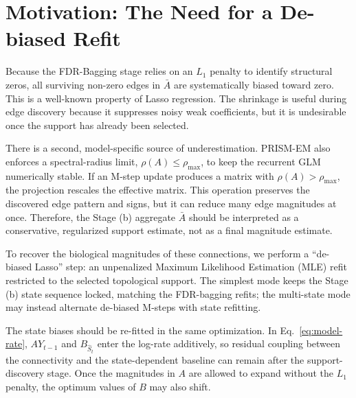 \documentclass[11pt]{article}
\begin{document}
\section{Motivation: The Need for a De-biased Refit}

Because the FDR-Bagging stage relies on an $L_1$ penalty to identify structural zeros, all surviving non-zero edges in $\bar{A}$ are systematically biased toward zero. This is a well-known property of Lasso regression. The shrinkage is useful during edge discovery because it suppresses noisy weak coefficients, but it is undesirable once the support has already been selected.

There is a second, model-specific source of underestimation. PRISM-EM also enforces a spectral-radius limit, $\rho(A)\le\rho_{\text{max}}$, to keep the recurrent GLM numerically stable. If an M-step update produces a matrix with $\rho(A)>\rho_{\text{max}}$, the projection rescales the effective matrix. This operation preserves the discovered edge pattern and signs, but it can reduce many edge magnitudes at once. Therefore, the Stage (b) aggregate $\bar{A}$ should be interpreted as a conservative, regularized support estimate, not as a final magnitude estimate.

To recover the biological magnitudes of these connections, we perform a ``de-biased Lasso'' step: an unpenalized Maximum Likelihood Estimation (MLE) refit restricted to the selected topological support. The simplest mode keeps the Stage (b) state sequence locked, matching the FDR-bagging refits; the multi-state mode may instead alternate de-biased M-steps with state refitting.

The state biases should be re-fitted in the same optimization. In Eq.~\eqref{eq:model-rate}, $A Y_{t-1}$ and $B_{\hat{S}_t}$ enter the log-rate additively, so residual coupling between the connectivity and the state-dependent baseline can remain after the support-discovery stage. Once the magnitudes in $A$ are allowed to expand without the $L_1$ penalty, the optimum values of $B$ may also shift.
\end{document}

